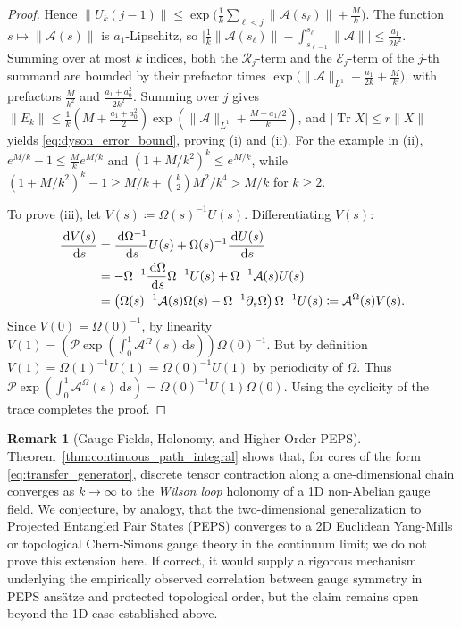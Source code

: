 \documentclass[11pt,a4paper,reqno]{amsart}
\theoremstyle{definition}
\newtheorem{remark}[theorem]{Remark}
\numberwithin{equation}{section}
\newcommand{\Tr}{\operatorname{Tr}}
\newcommand{\dif}{\,\mathrm{d}}
\begin{document}
\begin{proof}
Hence $\|U_k(j-1)\| \le \exp\big(\frac1k\sum_{\ell < j}\|\mathcal{A}(s_\ell)\| + \frac{M}{k}\big)$. The function $s \mapsto \|\mathcal{A}(s)\|$ is $a_1$-Lipschitz, so $\big|\frac1k\|\mathcal{A}(s_\ell)\| - \int_{s_{\ell-1}}^{s_\ell}\|\mathcal{A}\|\big| \le \frac{a_1}{2k^2}$. Summing over at most $k$ indices, both the $\mathcal{R}_j$-term and the $\mathcal{E}_j$-term of the $j$-th summand are bounded by their prefactor times $\exp\big(\|\mathcal{A}\|_{L^1} + \frac{a_1}{2k} + \frac{M}{k}\big)$, with prefactors $\frac{M}{k^2}$ and $\frac{a_1 + a_0^2}{2k^2}$. Summing over $j$ gives $\|E_k\| \le \frac1k(M + \frac{a_1 + a_0^2}{2})\exp(\|\mathcal{A}\|_{L^1} + \frac{M + a_1/2}{k})$, and $|\Tr X| \le r\|X\|$ yields \eqref{eq:dyson_error_bound}, proving (i) and (ii). For the example in (ii), $e^{M/k} - 1 \le \frac{M}{k}e^{M/k}$ and $(1+M/k^2)^k \le e^{M/k}$, while $(1 + M/k^2)^k - 1 \ge M/k + \binom{k}{2} M^2/k^4 > M/k$ for $k \ge 2$.

To prove (iii), let $V(s) \coloneqq \Omega(s)^{-1} U(s)$. Differentiating $V(s)$:
\begin{align}
    \frac{\dif V(s)}{\dif s} &= \frac{\dif \Omega^{-1}}{\dif s} U(s) + \Omega(s)^{-1} \frac{\dif U(s)}{\dif s} \notag \\
    &= -\Omega^{-1} \frac{\dif \Omega}{\dif s} \Omega^{-1} U(s) + \Omega^{-1} \mathcal{A}(s) U(s) \notag \\
    &= \left( \Omega(s)^{-1} \mathcal{A}(s) \Omega(s) - \Omega^{-1} \partial_s \Omega \right) \Omega^{-1} U(s) \coloneqq \mathcal{A}^\Omega(s) V(s).
\end{align}
Since $V(0) = \Omega(0)^{-1}$, by linearity $V(1) = \left( \mathcal{P} \exp(\int_0^1 \mathcal{A}^\Omega(s) \dif s) \right) \Omega(0)^{-1}$. But by definition $V(1) = \Omega(1)^{-1} U(1) = \Omega(0)^{-1} U(1)$ by periodicity of $\Omega$. Thus $\mathcal{P} \exp(\int_0^1 \mathcal{A}^\Omega(s) \dif s) = \Omega(0)^{-1} U(1) \Omega(0)$. Using the cyclicity of the trace completes the proof.
\end{proof}

\begin{remark}[Gauge Fields, Holonomy, and Higher-Order PEPS]
Theorem~\ref{thm:continuous_path_integral} shows that, for cores of the form \eqref{eq:transfer_generator}, discrete tensor contraction along a one-dimensional chain converges as $k \to \infty$ to the \emph{Wilson loop} holonomy of a 1D non-Abelian gauge field. We conjecture, by analogy, that the two-dimensional generalization to Projected Entangled Pair States (PEPS) converges to a 2D Euclidean Yang-Mills or topological Chern-Simons gauge theory in the continuum limit; we do not prove this extension here. If correct, it would supply a rigorous mechanism underlying the empirically observed correlation between gauge symmetry in PEPS ans\"atze and protected topological order, but the claim remains open beyond the 1D case established above.
\end{remark}
\end{document}
